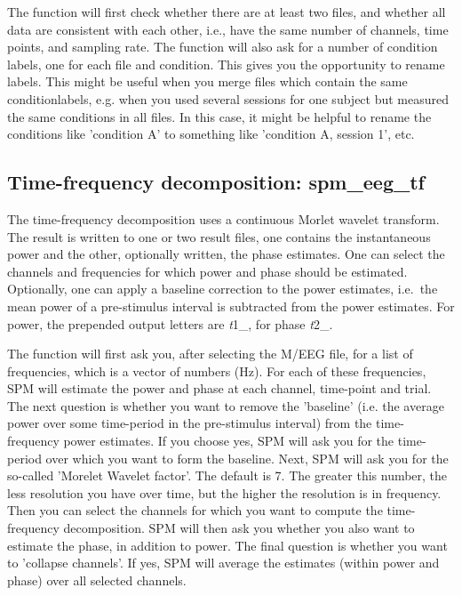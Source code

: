 The function will first check whether there are at least two files, and whether all data are consistent with each other, i.e., have the same number of channels, time points, and sampling rate. The function will also ask for a number of condition labels, one for each file and condition. This gives you the opportunity to rename labels. This might be useful when you merge files which contain the same conditionlabels, e.g. when you used several sessions for one subject but measured the same conditions in all files. In this case, it might be helpful to rename the conditions like 'condition A' to something like 'condition A, session 1', etc.



\subsection{Time-frequency decomposition: spm\_eeg\_tf}
\label{sec:tf}
The time-frequency decomposition uses a continuous
Morlet wavelet transform. The result is written to one or two result
files, one contains the instantaneous power and the other, optionally
written, the phase estimates. One can select the channels and
frequencies for which power and phase should be estimated. Optionally,
one can apply a baseline correction to the power estimates, i.e.~the
mean power of a pre-stimulus interval is subtracted from the power
estimates. For power, the prepended output letters are {\textit
  t1\_}, for phase {\textit t2\_}.

The function will first ask you, after selecting the M/EEG file, for a list of frequencies, which is a vector of numbers (Hz). For each of these frequencies, SPM will estimate the power and phase at each channel, time-point and trial. The next question is whether you want to remove the 'baseline' (i.e. the average power over some time-period in the pre-stimulus interval) from the time-frequency power estimates. If you choose yes, SPM will ask you for the time-period over which you want to form the baseline. Next, SPM will ask you for the so-called 'Morelet Wavelet factor'. The default is 7. The greater this number, the less resolution you have over time, but the higher the resolution is in frequency. Then you can select the channels for which you want to compute the time-frequency decomposition. SPM will then ask you whether you also want to estimate the phase, in addition to power. The final question is whether you want to 'collapse channels'. If yes, SPM will average the estimates (within power and phase) over all selected channels. 

